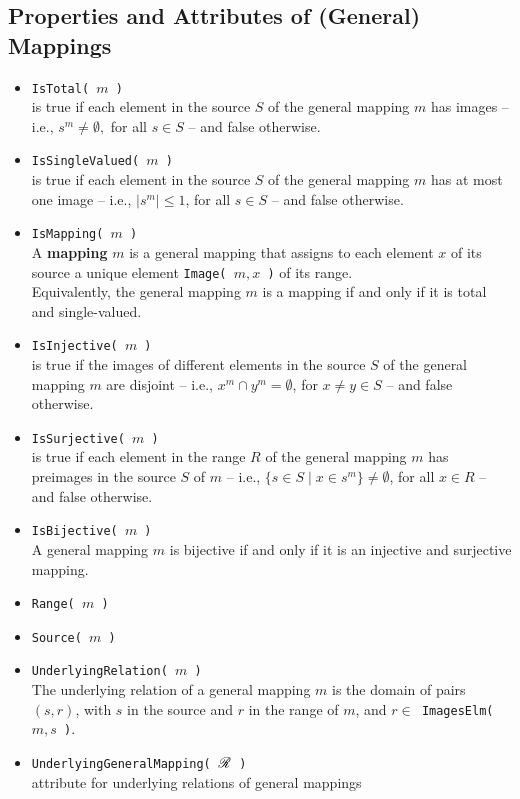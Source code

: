 \subsection{Properties and Attributes of (General) Mappings}
\label{sec:properties-of-mappings}
\begin{itemize}
\item  {\tt IsTotal( $m$ )}\\
is true if each element in the source $S$ of the general mapping $m$ has images 
-- i.e., $s^{m} \neq \emptyset,$ for all $s \in S$ -- 
and false otherwise.
\item  {\tt IsSingleValued( $m$ )}\\
is true if each element in the source $S$ of the general mapping $m$ has at most
one image -- i.e., $|s^{m}| \leq 1$, for all $s \in S$ -- and false otherwise.
\item  {\tt IsMapping( $m$ )}\\
A {\bf mapping} $m$ is a general mapping that assigns to each element $x$ of
its source a unique element {\tt Image( $m, x$ )} of its range.
\\[4pt]
Equivalently, the general mapping $m$ is a mapping if and only if it is total
and single-valued.
\item {\tt IsInjective( $m$ )}\\
is true if the images of different elements in the source $S$ of the general mapping
$m$ are disjoint -- i.e., $x^m \cap y^m = \emptyset$, for $x \neq y \in S$ -- and false otherwise.
\item {\tt IsSurjective( $m$ )}\\
is true if each element in the range $R$ of the general mapping $m$ has preimages in
the source $S$ of $m$ -- i.e., $\{s \in  S \mid x \in s^m \} \neq \emptyset$, for all
$x \in R$ -- and false otherwise.
\item {\tt IsBijective( $m$ )}\\
A general mapping $m$ is bijective if and only if it is an injective and surjective mapping.
\item {\tt Range( $m$ )}
\item {\tt Source( $m$ )}
\item {\tt UnderlyingRelation( $m$ )}\\
The underlying relation of a general mapping $m$ is the domain of pairs $(s, r)$,
with $s$ in the source and $r$ in the range of $m$, and 
{\tt $r \in $ ImagesElm( $m, s$ )}.
\item {\tt UnderlyingGeneralMapping( $\mathscr{R}$ )}\\
attribute for underlying relations of general mappings
\end{itemize}
\subsectionspace

